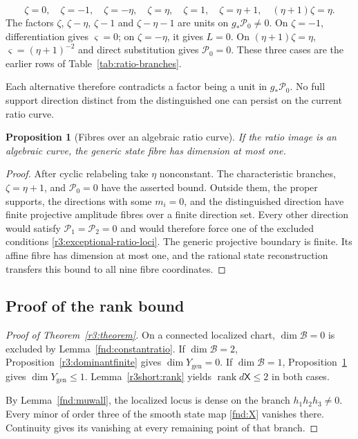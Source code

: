 \documentclass[11pt,a4paper]{article}
\numberwithin{equation}{section}
\theoremstyle{plain}
\newtheorem{proposition}[theorem]{Proposition}
\theoremstyle{definition}
\theoremstyle{remark}
\begin{document}
\begin{equation}\label{r3:exceptional-ratio-loci}
 \zeta=0,\quad\zeta=-1,\quad\zeta=-\eta,\quad
 \zeta=\eta,\quad\zeta=1,\quad\zeta=\eta+1,\quad
 (\eta+1)\zeta=\eta.
\end{equation}
The factors $\zeta$, $\zeta-\eta$, $\zeta-1$ and
$\zeta-\eta-1$ are units on $g_*\mathcal P_0\ne0$.
On $\zeta=-1$, differentiation gives $\varsigma=0$;
on $\zeta=-\eta$, it gives $L=0$.
On $(\eta+1)\zeta=\eta$,
$\varsigma=(\eta+1)^{-2}$ and direct substitution gives
$\mathcal P_0=0$. These three cases are the earlier rows of
Table~\ref{tab:ratio-branches}.

Each alternative therefore contradicts a factor being a unit
in $g_*\mathcal P_0$. No full support direction distinct from
the distinguished one can persist on the current ratio curve.

\begin{proposition}[Fibres over an algebraic ratio curve]
\label{r3:curvefibre}
If the ratio image is an algebraic curve, the generic state fibre
has dimension at most one.
\end{proposition}
\begin{proof}
After cyclic relabeling take $\eta$ nonconstant. The characteristic
branches, $\zeta=\eta+1$, and $\mathcal P_0=0$ have the asserted bound.
Outside them, the proper supports, the directions with some
$m_i=0$, and the distinguished direction have finite projective
amplitude fibres over a finite direction set. Every other
direction would satisfy $\mathcal P_1=\mathcal P_2=0$ and would
therefore force one of the excluded conditions
\eqref{r3:exceptional-ratio-loci}. The generic projective boundary
is finite. Its affine fibre has dimension at most one, and the
rational state reconstruction transfers this bound to all nine
fibre coordinates.
\end{proof}

\subsection{Proof of the rank bound}\label{r3:completion}
\begin{proof}[Proof of Theorem~\ref{r3:theorem}]
On a connected localized chart, $\dim\mathscr B=0$ is excluded by
Lemma~\ref{fnd:constantratio}. If $\dim\mathscr B=2$,
Proposition~\ref{r3:dominantfinite} gives $\dim Y_{\mathrm{gen}}=0$.
If $\dim\mathscr B=1$, Proposition~\ref{r3:curvefibre} gives
$\dim Y_{\mathrm{gen}}\le1$.
Lemma~\ref{r3short:rank} yields $\operatorname{rank}d\mathsf X\le2$
in both cases.

By Lemma~\ref{fnd:muwall}, the localized locus is dense on the
branch $h_1h_2h_3\ne0$. Every minor of order three of the smooth
state map \eqref{fnd:X} vanishes there. Continuity gives its
vanishing at every remaining point of that branch.
\end{proof}
\end{document}
